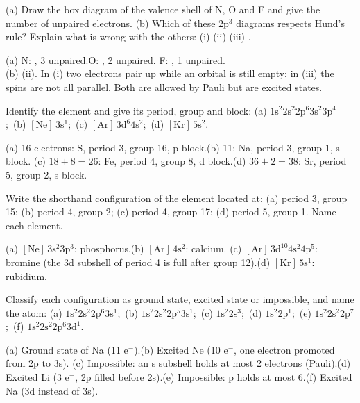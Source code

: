 (a) Draw the box diagram of the valence shell of N, O and F and give the number of unpaired
electrons. (b) Which of these 2p$^3$ diagrams respects Hund's rule? Explain what is wrong with the
others: (i) \quad (ii) \quad (iii) .
\begin{solution}
(a) N: \;, 3 unpaired.\quad O: \;, 2 unpaired.\quad
F: \;, 1 unpaired.\\
(b) (ii). In (i) two electrons pair up while an orbital is still empty; in (iii) the spins are not
all parallel. Both are allowed by Pauli but are excited states.
\end{solution}

Identify the element and give its period, group and block:
(a) $1\mathrm s^2 2\mathrm s^2 2\mathrm p^6 3\mathrm s^2 3\mathrm p^4$;\ (b) $[\mathrm{Ne}]\,3\mathrm s^1$;\
(c) $[\mathrm{Ar}]\,3\mathrm d^6 4\mathrm s^2$;\ (d) $[\mathrm{Kr}]\,5\mathrm s^2$.
\begin{solution}
(a) 16 electrons: S, period 3, group 16, p block.\quad (b) 11: Na, period 3, group 1, s block.\quad
(c) $18 + 8 = 26$: Fe, period 4, group 8, d block.\quad (d) $36 + 2 = 38$: Sr, period 5, group 2, s block.
\end{solution}

Write the shorthand configuration of the element located at: (a) period 3, group 15;
(b) period 4, group 2; (c) period 4, group 17; (d) period 5, group 1. Name each element.
\begin{solution}
(a) $[\mathrm{Ne}]\,3\mathrm s^2 3\mathrm p^3$: phosphorus.\quad (b) $[\mathrm{Ar}]\,4\mathrm s^2$: calcium.\quad
(c) $[\mathrm{Ar}]\,3\mathrm d^{10} 4\mathrm s^2 4\mathrm p^5$: bromine (the 3d subshell of period 4 is full
after group 12).\quad (d) $[\mathrm{Kr}]\,5\mathrm s^1$: rubidium.
\end{solution}

Classify each configuration as ground state, excited state or impossible, and name the atom:
(a) $1\mathrm s^2 2\mathrm s^2 2\mathrm p^6 3\mathrm s^1$;\ (b) $1\mathrm s^2 2\mathrm s^2 2\mathrm p^5 3\mathrm s^1$;\
(c) $1\mathrm s^2 2\mathrm s^3$;\ (d) $1\mathrm s^2 2\mathrm p^1$;\ (e) $1\mathrm s^2 2\mathrm s^2 2\mathrm p^7$;\
(f) $1\mathrm s^2 2\mathrm s^2 2\mathrm p^6 3\mathrm d^1$.
\begin{solution}
(a) Ground state of Na (11 e$^-$).\quad (b) Excited Ne (10 e$^-$, one electron promoted from 2p to 3s).\quad
(c) Impossible: an s subshell holds at most 2 electrons (Pauli).\quad (d) Excited Li (3 e$^-$, 2p filled
before 2s).\quad (e) Impossible: p holds at most 6.\quad (f) Excited Na (3d instead of 3s).
\end{solution}

